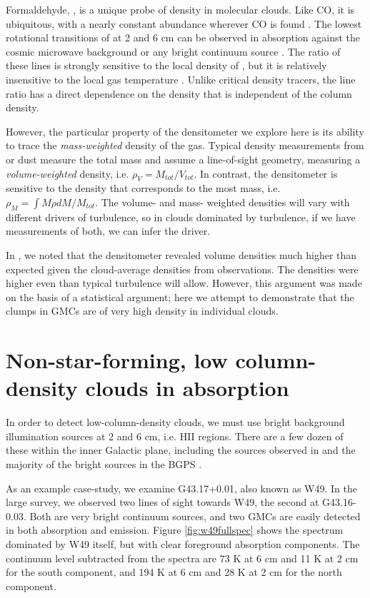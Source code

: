 Formaldehyde, \formaldehyde, is a unique probe of density in molecular clouds.
Like CO, it is ubiquitous, with a nearly constant abundance wherever CO is
found \citep{Tang2013a,Mangum1993a}.  The lowest rotational transitions of
\ortho at 2 and 6 cm can be observed in absorption against the cosmic microwave
background or any bright continuum source \citep{Ginsburg2011a,Darling2012b}.
The ratio of these lines is strongly sensitive to the local density of \hh, but
it is relatively insensitive to the local gas temperature
\citep{Wiesenfeld2013a,Troscompt2009a}.  Unlike critical density tracers, the
\formaldehyde line ratio has a direct dependence on the density that is
independent of the column density.

However, the particular property of the \formaldehyde densitometer we explore
here is its ability to trace the \emph{mass-weighted} density of the gas.
Typical density measurements from \thirteenco or dust measure the total mass
and assume a line-of-sight geometry, measuring a \emph{volume-weighted}
density, i.e. $\rho_V = M_{tot}/V_{tot}$.  In contrast, the \formaldehyde
densitometer is sensitive to the density that corresponds to the most mass,
i.e. $\rho_M = \int M \rho d M / M_{tot}$.  The volume- and mass- weighted
densities will vary with different drivers of turbulence, so in clouds
dominated by turbulence, if we have measurements of both, we can infer the
driver.

In \citet{Ginsburg2011a}, we noted that the \formaldehyde densitometer revealed
volume densities much higher than expected given the cloud-average densities
from \thirteenco observations.  The densities were higher even than typical
turbulence will allow.  However, this argument was made on the basis of a
statistical argument; here we attempt to demonstrate that the clumps in GMCs
are of very high density in individual clouds.


\section{Non-star-forming, low column-density clouds in absorption}

In order to detect low-column-density clouds, we must use bright background
illumination sources at 2 and 6 cm, i.e. HII regions.  There are a few dozen of
these within the inner Galactic plane, including the sources observed in
\citet{Ginsburg2011a} and the majority of the bright sources in the BGPS
\citep{Ginsburg2013a}.

As an example case-study, we examine G43.17+0.01, also known as W49.  In the
large survey, we observed two lines of sight towards W49, the second at
G43.16-0.03.  Both are very bright continuum sources, and two GMCs are easily
detected in both \formaldehyde absorption and \thirteenco emission.  Figure
\ref{fig:w49fullspec} shows the spectrum dominated by W49 itself, but with
clear foreground absorption components.  The continuum level subtracted from the spectra
are 73 K at 6 cm and 11 K at 2 cm for the south component, and 194 K at 6 cm
and 28 K at 2 cm for the north component.

